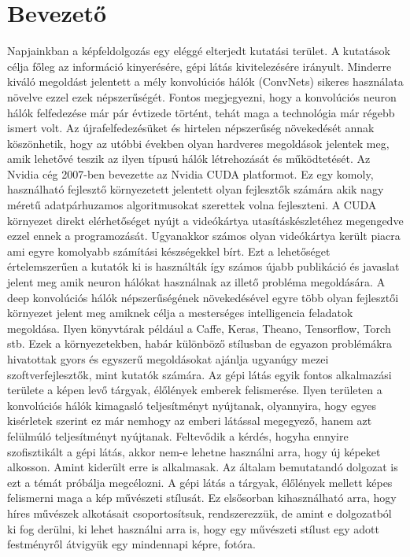 \documentclass[12pt, a4paper, oneside]{book}
\theoremstyle{tetel}
\newcommand\capterro[1]{%
  \addcontentsline{tce}{chapter}{\protect\makebox[1.3em][l]{\thechapter.}#1}}
\newcommand\capteren[1]{%
  \addcontentsline{tcen}{chapter}{\protect\makebox[1.3em][l]{\thechapter.}#1}}
\begin{document}
\newpage
\tableofcontents
\newpage
\listofindice
\newpage
\listofindiceen


\chapter{Bevezető}
\capterro{Întroducere}
\capteren{Indroduction}

Napjainkban a képfeldolgozás egy eléggé elterjedt kutatási terület. A kutatások célja főleg az információ kinyerésére, gépi látás kivitelezésére irányult. Minderre kiváló megoldást jelentett a mély konvolúciós hálók (ConvNets)\cite{1}\cite{2} sikeres használata növelve ezzel ezek népszerűségét. Fontos megjegyezni, hogy a konvolúciós neuron hálók felfedezése már pár évtizede történt, tehát maga a technológia már régebb ismert volt. Az újrafelfedezésüket és hirtelen népszerűség növekedését annak köszönhetik, hogy az utóbbi években olyan hardveres megoldások jelentek meg, amik lehetővé teszik az ilyen típusú hálók létrehozását és működtetését. 
\newline 
\indent
Az Nvidia cég 2007-ben bevezette az Nvidia CUDA platformot\cite{3}. Ez egy komoly, használható fejlesztő környezetett jelentett olyan fejlesztők számára akik nagy méretű adatpárhuzamos algoritmusokat szerettek volna fejleszteni. A CUDA környezet direkt elérhetőséget nyújt a videókártya utasításkészletéhez megengedve ezzel ennek a programozását. Ugyanakkor számos olyan videókártya került piacra ami egyre komolyabb számítási készségekkel bírt. Ezt a lehetőséget értelemszerűen a kutatók ki is használták így számos újabb publikáció és javaslat jelent meg amik neuron hálókat használnak az illető probléma megoldására.
\newline
\indent
A deep konvolúciós hálók népszerűségének növekedésével egyre több olyan fejlesztői környezet jelent meg amiknek célja a mesterséges intelligencia feladatok megoldása. Ilyen könyvtárak például a Caffe\cite{4}, Keras\cite{5}, Theano\cite{6}, Tensorflow\cite{7}, Torch\cite{8} stb. Ezek a környezetekben, habár különböző stílusban de egyazon problémákra hivatottak gyors és egyszerű megoldásokat ajánlja ugyanúgy mezei szoftverfejlesztők, mint kutatók számára.
\newline
\indent
Az gépi látás egyik fontos alkalmazási területe a képen levő tárgyak, élőlények emberek felismerése. Ilyen területen a konvolúciós hálók kimagasló teljesítményt nyújtanak, olyannyira, hogy egyes kisérletek szerint ez már nemhogy az emberi látással megegyező, hanem azt felülmúló teljesítményt nyújtanak\cite{9}. Feltevődik a kérdés, hogyha ennyire szofisztikált a gépi látás, akkor nem-e lehetne használni arra, hogy új képeket alkosson. Amint kiderült erre is alkalmasak. Az általam bemutatandó dolgozat is ezt a témát próbálja megcélozni. A gépi látás a tárgyak, élőlények mellett képes felismerni maga a kép művészeti stílusát. Ez elsősorban kihasználható arra, hogy híres művészek alkotásait csoportosítsuk, rendszerezzük\cite{10}, de amint e dolgozatból ki fog derülni, ki lehet használni arra is, hogy egy művészeti stílust egy adott festményről átvigyük egy mindennapi képre, fotóra. 
\end{document}

